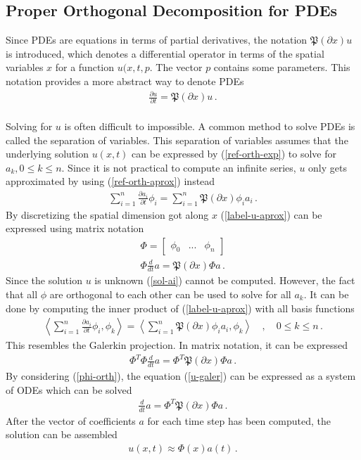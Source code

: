 \subsection{Proper Orthogonal Decomposition for PDEs}
Since PDEs are equations in terms of partial derivatives, the notation \(\mathfrak{P}(\partial x) u\) is introduced, which denotes a differential operator in terms of the spatial variables \(x\) for a function \(u(x,t,p\).
The vector \(p\) contains some parameters.
This notation provides a more abstract way to denote PDEs
\begin{gather}
\frac{\partial u}{\partial t} = \mathfrak{P}(\partial x) u \,.
\end{gather}
\cite{Gustafsson2011f} \\
Solving for \(u\) is often difficult to impossible.
A common method to solve PDEs is called the separation of variables.
This separation of variables assumes that the underlying solution \(u(x, t)\) can be expressed by (\ref{ref-orth-exp}) to solve for \(a_k, 0 \leq k \leq n\).
Since it is not practical to compute an infinite series, \(u\) only gets approximated by using (\ref{ref-orth-aprox}) instead
\begin{gather}
\sum_{i = 1} ^{n} \frac{\partial a_i}{\partial t} \phi_i = \sum_{i = 1} ^{n} \mathfrak{P}(\partial x) \phi_i a_i \,. \label{label-u-aprox} 
\end{gather}
By discretizing the spatial dimension got along \(x\) (\ref{label-u-aprox}) can be expressed using matrix notation
\begin{gather}
\Phi = \begin{bmatrix}
\phi_0 & ... & \phi_n
\end{bmatrix} \label{mat-phi}\\
\Phi \frac{d}{dt}a = \mathfrak{P}(\partial x) \Phi a \,.
\end{gather}
Since the solution \(u\) is unknown (\ref{sol-ai}) cannot be computed.
However, the fact that all \(\phi\) are orthogonal to each other can be used to solve for all \(a_k\).
It can be done by computing the inner product of (\ref{label-u-aprox}) with all basis functions
\begin{gather}
\left\langle \sum_{i = 1} ^{n} \frac{\partial a_i}{\partial t} \phi_i, \phi_k \right\rangle = \left\langle\sum_{i = 1} ^{n} \mathfrak{P}(\partial x) \phi_i a_i, \phi_k \right\rangle \quad, \quad 0 \leq k \leq n \,. \label{u-galer}
\end{gather}
This resembles the Galerkin projection.
In matrix notation, it can be expressed
\begin{gather}
\Phi^{T}\Phi \frac{d}{dt}a = \Phi^{T}\mathfrak{P}(\partial x) \Phi a \,.
\end{gather}
By considering (\ref{phi-orth}), the equation (\ref{u-galer}) can be expressed as a system of ODEs which can be solved
\begin{gather}
\frac{d}{dt} a = \Phi^{T}\mathfrak{P}(\partial x) \Phi a \,.
\end{gather}
After the vector of coefficients \(a\) for each time step has been computed, the solution can be assembled \cite{brunton_kutz_2019c}
\begin{gather}
u(x, t) \approx \Phi(x)a(t) \,. \label{u-aprox-pod}
\end{gather} 
